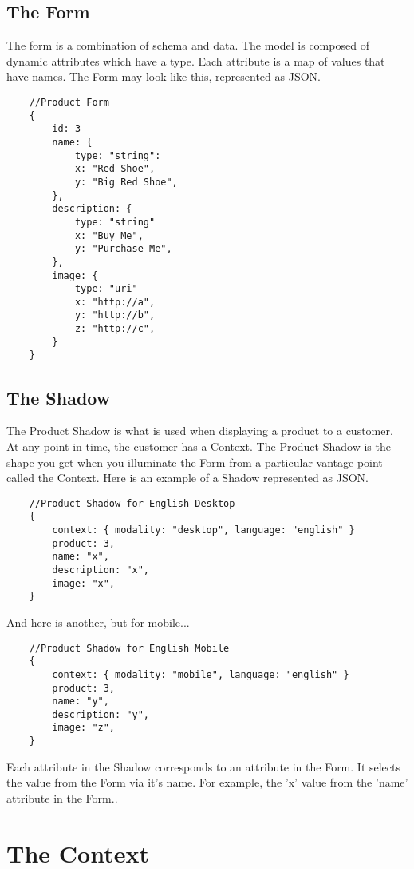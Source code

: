 \documentclass[11pt]{article}
\begin{document}
\newpage
\subsection{The Form}
The form is a combination of schema and data. The model is composed of dynamic
attributes which have a type. Each attribute is a map of values that have names.
The Form may look like this, represented as JSON.

\begin{lstlisting}
    //Product Form
    {
        id: 3
        name: { 
            type: "string": 
            x: "Red Shoe", 
            y: "Big Red Shoe", 
        },
        description: { 
            type: "string"
            x: "Buy Me", 
            y: "Purchase Me", 
        },
        image: { 
            type: "uri"
            x: "http://a", 
            y: "http://b", 
            z: "http://c",  
        } 
    }
\end{lstlisting}


\newpage
\subsection{The Shadow}
The Product Shadow is what is used when displaying a product to a customer.
At any point in time, the customer has a Context. The Product Shadow is the shape 
you get when you illuminate the Form from a particular vantage point called the Context.  
Here is an example of a Shadow represented as JSON.

\begin{lstlisting}
    //Product Shadow for English Desktop
    {
        context: { modality: "desktop", language: "english" }
        product: 3,
        name: "x",
        description: "x",
        image: "x",
    }
\end{lstlisting}

And here is another, but for mobile...

\begin{lstlisting}
    //Product Shadow for English Mobile
    {
        context: { modality: "mobile", language: "english" }
        product: 3,
        name: "y",
        description: "y",
        image: "z",
    }
\end{lstlisting}

Each attribute in the Shadow corresponds to an attribute in the Form. It selects
the value from the Form via it's name. For example, the 'x' value from the 'name' 
attribute in the Form..


\section{The Context}
\end{document}
